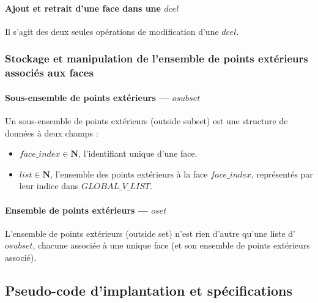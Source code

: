 \documentclass[]{article}
\begin{document}
\paragraph{Ajout et retrait d'une face dans une $dcel$}
Il s'agit des deux seules opérations de modification d'une $dcel$.

\subsubsection{Stockage et manipulation de l'ensemble de points extérieurs associés aux faces}
\paragraph*{Sous-ensemble de points extérieurs — $osubset$}
Un sous-ensemble de points extérieurs (outside subset) est une structure de données à deux champs :
\begin{itemize}
	\item $face\_index \in \mathbf{N}$, l'identifiant unique d'une face.
	\item $list \in \mathbf{N}$, l'ensemble des points extérieurs à la face $face\_index$, représentés par leur indice dans $GLOBAL\_V\_LIST$.
\end{itemize}

\paragraph*{Ensemble de points extérieurs — $oset$}
L'ensemble de points extérieurs (outside set) n'est rien d'autre qu'une liste d'$osubset$, chacune associée à une unique face (et son ensemble de points extérieurs associé).

\subsection{Pseudo-code d'implantation et spécifications}\label{pseudo-code_implantation}
\end{document}
